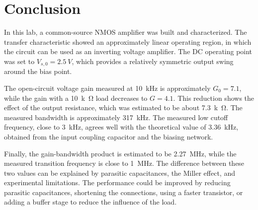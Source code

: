 \documentclass[11pt,a4paper]{article}
\begin{document}
\section{Conclusion}

In this lab, a common-source NMOS amplifier was built and characterized. The transfer characteristic showed an approximately linear operating region, in which the circuit can be used as an inverting voltage amplifier. The DC operating point was set to $V_{s,0}=\SI{2.5}{V}$, which provides a relatively symmetric output swing around the bias point.

The open-circuit voltage gain measured at \SI{10}{kHz} is approximately $G_0=7.1$, while the gain with a \SI{10}{k\ohm} load decreases to $G=4.1$. This reduction shows the effect of the output resistance, which was estimated to be about \SI{7.3}{k\ohm}. The measured bandwidth is approximately \SI{317}{kHz}. The measured low cutoff frequency, close to \SI{3}{kHz}, agrees well with the theoretical value of \SI{3.36}{kHz}, obtained from the input coupling capacitor and the biasing network.

Finally, the gain-bandwidth product is estimated to be \SI{2.27}{MHz}, while the measured transition frequency is close to \SI{1}{MHz}. The difference between these two values can be explained by parasitic capacitances, the Miller effect, and experimental limitations. The performance could be improved by reducing parasitic capacitances, shortening the connections, using a faster transistor, or adding a buffer stage to reduce the influence of the load.
\end{document}
